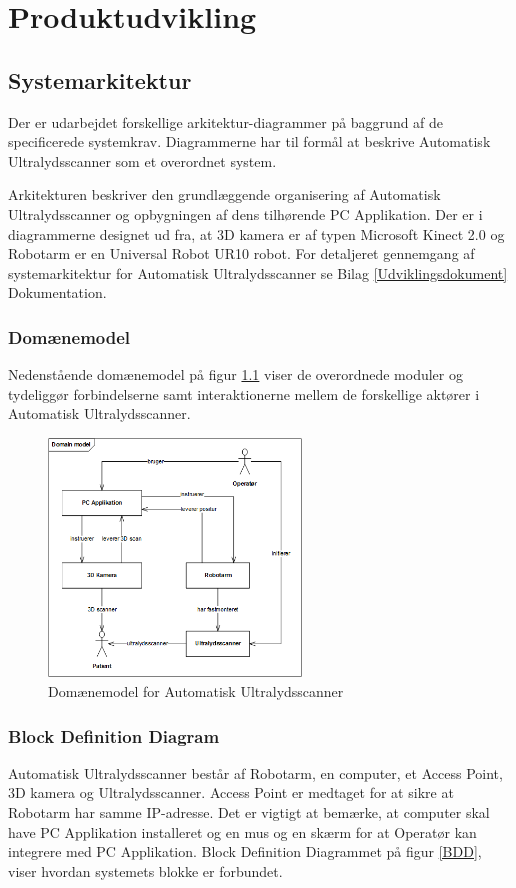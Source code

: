 \chapter{Produktudvikling}\label{Produktudvikling} 

\section{Systemarkitektur}\label{Systemarkitektur}
Der er udarbejdet forskellige arkitektur-diagrammer på baggrund af de specificerede systemkrav. Diagrammerne har til formål at beskrive Automatisk Ultralydsscanner som et overordnet system.

Arkitekturen beskriver den grundlæggende organisering af Automatisk Ultralydsscanner og opbygningen af dens tilhørende PC Applikation. Der er i diagrammerne designet ud fra, at 3D kamera er af typen Microsoft Kinect 2.0 og Robotarm er en Universal Robot UR10 robot. For detaljeret gennemgang af systemarkitektur for Automatisk Ultralydsscanner se Bilag  \ref{Udviklingsdokument} Dokumentation.

\subsection{Domænemodel}
Nedenstående domænemodel på figur \ref{domain} viser de overordnede moduler og tydeliggør forbindelserne samt interaktionerne mellem de forskellige aktører i Automatisk Ultralydsscanner. 

\begin{figure}[H]
    \centering
    \includegraphics[width=0.6\textwidth]{figurer/d/Design/uml_domain}
    \caption{Domænemodel for Automatisk Ultralydsscanner}
    \label{domain}
\end{figure}

\subsection{Block Definition Diagram}
Automatisk Ultralydsscanner består af Robotarm, en computer, et Access Point, 3D kamera og Ultralydsscanner. Access Point er medtaget for at sikre at Robotarm har samme IP-adresse. Det er vigtigt at bemærke, at computer skal have PC Applikation installeret og en mus og en skærm for at Operatør kan integrere med PC Applikation. Block Definition Diagrammet på figur \ref{BDD}, viser hvordan systemets blokke er forbundet. 

